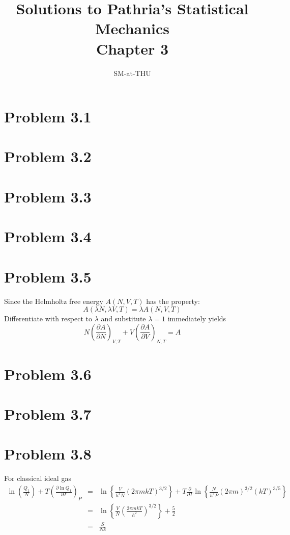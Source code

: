 \documentclass{article}
\author{SM-at-THU}
\title{\bf{Solutions to Pathria's Statistical Mechanics}\\Chapter 3}
\begin{document}
\maketitle

\section*{Problem 3.1}

\section*{Problem 3.2}

\section*{Problem 3.3}

\section*{Problem 3.4}

\section*{Problem 3.5}
	Since the Helmholtz free energy $A(N,V,T)$ has the property:
	\begin{equation*}
		A(\lambda N,\lambda V,T) = \lambda A(N,V,T)
	\end{equation*}
	Differentiate with respect to $\lambda$ and substitute $\lambda=1$ immediately yields
	\begin{equation*}
		N\left( \frac{ \partial A }{\partial N} \right)_{V,T}+V \left( \frac{ \partial A }{\partial V} \right)_{N,T} = A
	\end{equation*}

\section*{Problem 3.6}

\section*{Problem 3.7}

\section*{Problem 3.8}
For classical ideal gas
\begin{eqnarray*}
\ln\left(\frac{Q_1}{N}\right)+T\left(\frac{\partial \ln Q_1}{\partial T}\right)_P&=&\ln\left\{\frac{V}{h^3N}(2\pi mkT)^{3/2}\right\}+T\frac{\partial}{\partial T}\ln\left\{\frac{N}{h^3P}(2\pi m)^{3/2}(kT)^{3/5}\right\}\\
&=&\ln\left\{\frac{V}{N}(\frac{2\pi mkT}{h^2})^{3/2}\right\}+\frac{5}{2}\\
&=&\frac{S}{Nk}
\end{eqnarray*}
\end{document}
